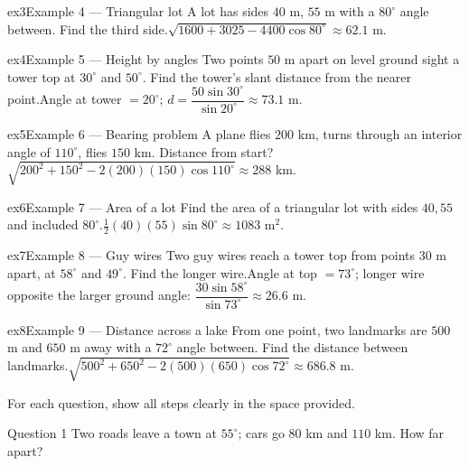 \documentclass[11pt]{article}
\begin{document}
\begin{example}{ex3}{Example 4 --- Triangular lot}
A lot has sides $40$ m, $55$ m with a $80^\circ$ angle between. Find the third side.\soln $\sqrt{1600+3025-4400\cos80^\circ}\approx62.1$ m.
\end{example}

\begin{example}{ex4}{Example 5 --- Height by angles}
Two points $50$ m apart on level ground sight a tower top at $30^\circ$ and $50^\circ$. Find the tower's slant distance from the nearer point.\soln Angle at tower $=20^\circ$; $d=\dfrac{50\sin30^\circ}{\sin20^\circ}\approx73.1$ m.
\end{example}

\begin{example}{ex5}{Example 6 --- Bearing problem}
A plane flies $200$ km, turns through an interior angle of $110^\circ$, flies $150$ km. Distance from start?\soln $\sqrt{200^2+150^2-2(200)(150)\cos110^\circ}\approx288$ km.
\end{example}

\begin{example}{ex6}{Example 7 --- Area of a lot}
Find the area of a triangular lot with sides $40,55$ and included $80^\circ$.\soln $\tfrac12(40)(55)\sin80^\circ\approx1083$ m$^2$.
\end{example}

\begin{example}{ex7}{Example 8 --- Guy wires}
Two guy wires reach a tower top from points $30$ m apart, at $58^\circ$ and $49^\circ$. Find the longer wire.\soln Angle at top $=73^\circ$; longer wire opposite the larger ground angle: $\dfrac{30\sin58^\circ}{\sin73^\circ}\approx26.6$ m.
\end{example}

\begin{example}{ex8}{Example 9 --- Distance across a lake}
From one point, two landmarks are $500$ m and $650$ m away with a $72^\circ$ angle between. Find the distance between landmarks.\soln $\sqrt{500^2+650^2-2(500)(650)\cos72^\circ}\approx686.8$ m.
\end{example}

\clearpage
{}
For each question, show all steps clearly in the space provided.

\begin{qbox}{Question 1}
Two roads leave a town at $55^\circ$; cars go $80$ km and $110$ km. How far apart?\workspace{2.4cm}
\end{qbox}
\end{document}

